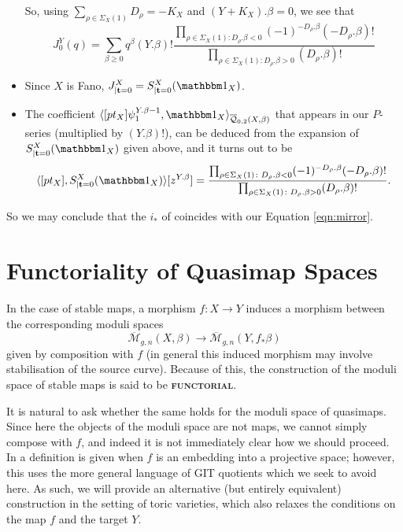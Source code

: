 \documentclass[11pt]{amsart}
\newcommand{\M}[4]{\overline{\mathcal M}_{#1,#2}(#3,#4)}
\newcommand{\Q}[4]{\overline{\mathcal Q}_{#1,#2}(#3,#4)}
\renewcommand{\to}{\rightarrow}
\newcommand{\ildef}[1]{\textbf{\textsc{#1}}}
\theoremstyle{plain}
\theoremstyle{definition}
\begin{document}
\begin{itemize}[leftmargin=*]
\[ \]
So, using $\sum_{\rho\in\Sigma_X(1)} D_{\rho}=-K_X$ and $(Y+K_X).\beta=0$, we see that
\[
 J^Y_0(q)=\sum_{\beta\geq 0}q^\beta(Y.\beta)!\frac{\prod_{\rho\in\Sigma_X(1)\colon D_\rho.\beta< 0}(-1)^{-D_{\rho}.\beta}(-D_{\rho}.\beta)!}{\prod_{\rho\in\Sigma_X(1)\colon D_\rho.\beta> 0}(D_{\rho}.\beta)!}
\]
\item Since $X$ is Fano, $J^X_{|{\bf t}=0}=S^X_{|{\bf t}=0}(\mathbbm 1_X)$.
\item The coefficient $\langle[pt_X]\psi_1^{Y.\beta-1},\mathbbm 1_X\rangle_{\Q{0}{2}{X}{\beta}}$ that appears in our $P$-series (multiplied by $(Y.\beta)!$), can be deduced from the expansion of $S^X_{|{\bf t}=0}(\mathbbm 1_X)$ given above, and it turns out to be
\[
 \langle [pt_X],S^X_{|{\bf t}=0}(\mathbbm 1_X)\rangle[z^{Y.\beta}]=\frac{\prod_{\rho\in\Sigma_X(1)\colon D_\rho.\beta< 0}(-1)^{-D_{\rho}.\beta}(-D_{\rho}.\beta)!}{\prod_{\rho\in\Sigma_X(1)\colon D_\rho.\beta> 0}(D_{\rho}.\beta)!}.
\]

\end{itemize}

So we may conclude that the $i_*$ of \cite[Corollary 5.5.1]{CF-K-wallcrossing} coincides with our Equation \ref{eqn:mirror}.

\newpage

\appendix
\section{Functoriality of Quasimap Spaces} \label{Functoriality of Quasimap Spaces Section}

In the case of stable maps, a morphism $f : X \to Y$ induces a morphism between the corresponding moduli spaces
\begin{equation*}\M{g}{n}{X}{\beta} \rightarrow \M{g}{n}{Y}{f_* \beta} \end{equation*}
given by composition with $f$ (in general this induced morphism may involve stabilisation of the source curve). Because of this, the construction of the moduli space of stable maps is said to be \ildef{functorial}.

It is natural to ask whether the same holds for the moduli space of quasimaps. Since here the objects of the moduli space are not maps, we cannot simply compose with $f$, and indeed it is not immediately clear how we should proceed. In \cite[Section 3.1]{CF-K-wallcrossing} a definition is given when $f$ is an embedding into a projective space; however, this uses the more general language of GIT quotients which we seek to avoid here. As such, we will provide an alternative (but entirely equivalent) construction in the setting of toric varieties, which also relaxes the conditions on the map $f$ and the target $Y$.
\end{document}
